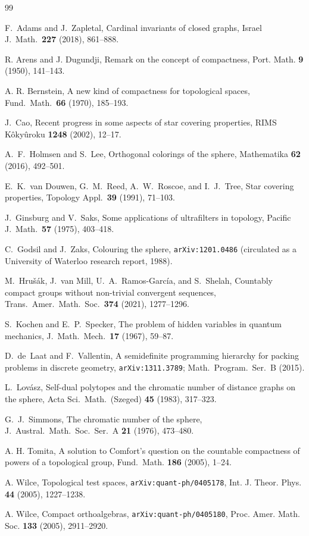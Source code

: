 \documentclass[12pt]{article}
\theoremstyle{plain}
\theoremstyle{definition}
\theoremstyle{remark}
\begin{document}
\begin{thebibliography}{99}

 F.~Adams and J.~Zapletal, Cardinal invariants of closed graphs, Israel J.\ Math.\ {\bf 227} (2018), 861--888.

 R. Arens and J. Dugundji, Remark on the concept of compactness, Port. Math. {\bf 9} (1950), 141--143.

 A. R. Bernstein, A new kind of compactness for topological spaces, Fund.\ Math.\ {\bf 66} (1970), 185--193.

 J.~Cao, Recent progress in some aspects of star covering properties, RIMS K\^oky\^uroku {\bf 1248} (2002), 12--17.


 A.~F.~Holmsen and S.~Lee, Orthogonal colorings of the sphere, Mathematika {\bf 62} (2016), 492--501.

 E.~K.~van Douwen, G.~M.~Reed, A.~W.~Roscoe, and I.~J.~Tree, Star covering properties, Topology Appl.\ {\bf 39} (1991), 71--103.

 J.~Ginsburg and V.~Saks, Some applications of ultrafilters in topology, Pacific J.\ Math.\ {\bf 57} (1975), 403--418.

 C.~Godsil and J.~Zaks, Colouring the sphere, {\tt arXiv:1201.0486} (circulated as a University of Waterloo research report, 1988).

 M.~Hru\v{s}\'ak, J.~van Mill, U.~A.~Ramos-Garc\'ia, and S.~Shelah, Countably compact groups without non-trivial convergent sequences, Trans.\ Amer.\ Math.\ Soc.\ {\bf 374} (2021), 1277--1296.


 S.~Kochen and E.~P.~Specker, The problem of hidden variables in quantum mechanics, J.\ Math.\ Mech.\ {\bf 17} (1967), 59--87.

 D.~de~Laat and F.~Vallentin, A semidefinite programming hierarchy for packing problems in discrete geometry, {\tt arXiv:1311.3789}; Math.\ Program.\ Ser.\ B (2015).

 L.~Lov\'asz, Self-dual polytopes and the chromatic number of distance graphs on the sphere, Acta Sci.\ Math.\ (Szeged) {\bf 45} (1983), 317--323.

 G.~J.~Simmons, The chromatic number of the sphere, J.\ Austral.\ Math.\ Soc.\ Ser.\ A {\bf 21} (1976), 473--480.

 A. H. Tomita, A solution to Comfort's question on the countable compactness of powers of a
topological group, Fund.\ Math. {\bf 186} (2005), 1--24.


 A. Wilce, Topological test spaces, {\tt arXiv:quant-ph/0405178}, Int. J. Theor. Phys. 
{\bf 44} (2005), 1227--1238.

 A. Wilce, Compact orthoalgebras,
{\tt arXiv:quant-ph/0405180}, Proc. Amer. Math. Soc. {\bf 133} (2005), 2911--2920.

\end{thebibliography}
\end{document}
